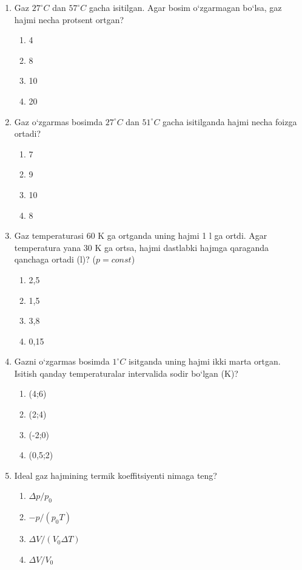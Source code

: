 \begin{enumerate}
\item Gaz $27^\circ C$ dan $57^\circ C$ gacha isitilgan. Agar bosim o‘zgarmagan bo‘lsa, gaz hajmi necha protsent ortgan?
\begin{enumerate}[label=\Alph*)]
\item 4
\item 8
\item 10
\item 20
\end{enumerate}

\item Gaz o‘zgarmas bosimda $27^\circ C$ dan $51^\circ C$ gacha isitilganda hajmi necha foizga ortadi?
\begin{enumerate}[label=\Alph*)]
\item 7
\item 9
\item 10
\item 8
\end{enumerate}

\item Gaz temperaturasi 60 K ga ortganda uning hajmi 1 l ga ortdi. Agar temperatura yana 30 K ga ortsa, hajmi dastlabki hajmga qaraganda qanchaga ortadi (l)? ($p=const$)
\begin{enumerate}[label=\Alph*)]
\item 2,5
\item 1,5
\item 3,8
\item 0,15
\end{enumerate}

\item Gazni o‘zgarmas bosimda $1^\circ C$ isitganda uning hajmi ikki marta ortgan. Isitish qanday temperaturalar intervalida sodir bo‘lgan (K)?
\begin{enumerate}[label=\Alph*)]
\item (4;6)
\item (2;4)
\item (-2;0)
\item (0,5;2)
\end{enumerate}

\item Ideal gaz hajmining termik koeffitsiyenti nimaga teng?
\begin{enumerate}[label=\Alph*)]
\item $\Delta p / p_0$
\item $-p / (p_0 T)$
\item $\Delta V / (V_0 \Delta T)$
\item $\Delta V / V_0$
\end{enumerate}


\end{enumerate}
